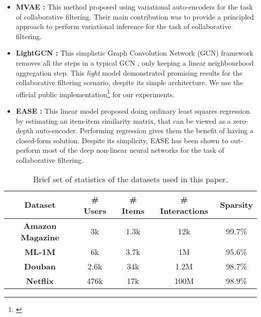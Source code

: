 \documentclass{article}
\begin{document}
\begin{itemize}[leftmargin=.3in]
    \item \textbf{MVAE \cite{mvae}:} This method proposed using variational auto-encoders for the task of collaborative filtering. Their main contribution was to provide a principled approach to perform variational inference for the task of collaborative filtering. 
    
    \item \textbf{LightGCN \cite{light_gcn}:} This simplistic Graph Convolution Network (GCN) framework removes all the steps in a typical GCN \cite{gcn}, only keeping a linear neighbourhood aggregation step. This \emph{light} model demonstrated promising results for the collaborative filtering scenario, despite its simple architecture. We use the official public implementation\footnote{\href{https://github.com/gusye1234/LightGCN-PyTorch}{\color{blue}{https://github.com/gusye1234/LightGCN-PyTorch}}} for our experiments.
    
    \item \textbf{EASE \cite{ease}:} This linear model proposed doing ordinary least squares regression by estimating an item-item similarity matrix, that can be viewed as a zero-depth auto-encoder. Performing regression gives them the benefit of having a closed-form solution. Despite its simplicity, EASE has been shown to out-perform most of the deep non-linear neural networks for the task of collaborative filtering.
\end{itemize}

\begin{table*}\begin{small} \caption{Brief set of statistics of the datasets used in this paper.}
    \label{data_stats}
    \begin{center}
        \begin{tabular}{c | c c c c}
            \toprule
            Dataset & \# Users & \# Items & \# Interactions & Sparsity \\
            
            \midrule
            
\textbf{Amazon Magazine \cite{amz_data}}            & 3k & 1.3k & 12k & 99.7\% \\
            \textbf{ML-1M \cite{movielens}}                      & 6k & 3.7k & 1M & 95.6\% \\
            \textbf{Douban \cite{douban_data}}                     & 2.6k & 34k & 1.2M & 98.7\% \\
\textbf{Netflix \cite{netflix_data}}                    & 476k & 17k & 100M & 98.9\% \\
            
            \bottomrule
        \end{tabular}
    \end{center}
    \end{small}
\end{table*} 
\end{document}
